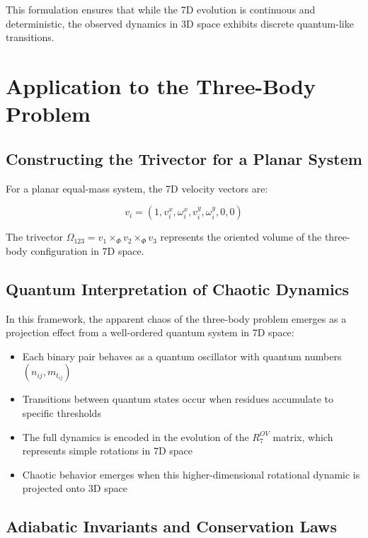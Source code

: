 \documentclass{article}
\begin{document}
This formulation ensures that while the 7D evolution is continuous and deterministic, the observed dynamics in 3D space exhibits discrete quantum-like transitions.

\section{Application to the Three-Body Problem}

\subsection{Constructing the Trivector for a Planar System}

For a planar equal-mass system, the 7D velocity vectors are:

\begin{equation}
v_i = (1, v_i^x, \omega_i^x, v_i^y, \omega_i^y, 0, 0)
\end{equation}

The trivector $\Omega_{123} = v_1 \times_\Phi v_2 \times_\Phi v_3$ represents the oriented volume of the three-body configuration in 7D space.

\subsection{Quantum Interpretation of Chaotic Dynamics}

In this framework, the apparent chaos of the three-body problem emerges as a projection effect from a well-ordered quantum system in 7D space:

\begin{itemize}
\item Each binary pair behaves as a quantum oscillator with quantum numbers $(n_{ij}, m_{t_{ij}})$
\item Transitions between quantum states occur when residues accumulate to specific thresholds
\item The full dynamics is encoded in the evolution of the $R^{OV}_7$ matrix, which represents simple rotations in 7D space
\item Chaotic behavior emerges when this higher-dimensional rotational dynamic is projected onto 3D space
\end{itemize}

\subsection{Adiabatic Invariants and Conservation Laws}
\end{document}
